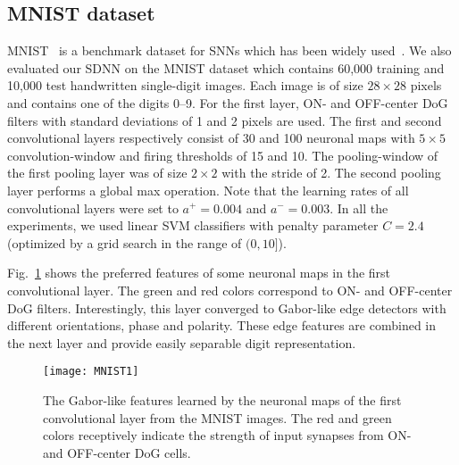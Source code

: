 \documentclass[preprint,5p,12pt,twocolumn]{article}
\begin{document}
\subsection*{MNIST dataset}
MNIST~\cite{lecun1998gradient} is a benchmark dataset for SNNs which has been widely used~\cite{hussain2014improved,zhao2015feedforward,querlioz2013immunity,o2015real,diehl2015unsupervised,diehl2015fast}. We also evaluated our SDNN on the MNIST dataset which contains 60,000 training and 10,000 test handwritten single-digit images.  Each image is of size $28 \times 28$ pixels and contains one of the digits 0--9. For the first layer, ON- and OFF-center DoG filters with standard deviations of 1 and 2 pixels are used. The first and second convolutional layers respectively consist of 30 and 100 neuronal maps with $5 \times 5$ convolution-window and firing thresholds of 15 and 10. The pooling-window of the first pooling layer was of size $2 \times 2$ with the stride of 2. The second pooling layer performs a global max operation. Note that the learning rates of all convolutional layers were set to $a^{+}=0.004$ and $a^{-}=0.003$. In all the experiments, we used linear SVM classifiers with penalty parameter $C=2.4$ (optimized by a grid search in the range of $(0,10]$). 


Fig.~\ref{figure5} shows the preferred features of some neuronal maps in the first  convolutional layer. The green and red colors correspond to ON- and OFF-center DoG filters. Interestingly, this layer converged to Gabor-like edge detectors with different orientations, phase and polarity. These edge features are combined in the next layer and provide easily separable digit representation.

\begin{figure}[!tb]
\centering
\texttt{[image: MNIST1]}
\caption{The Gabor-like features learned by the neuronal maps of the first convolutional layer from the MNIST images. The red and green colors receptively indicate the  strength of input synapses from ON- and OFF-center DoG cells.}
\label{figure5}
\end{figure}
\end{document}
